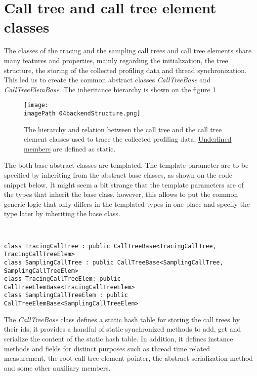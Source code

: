 \section{Call tree and call tree element classes}
The classes of the tracing and the sampling call trees and call tree elements share many features and properties, mainly regarding the initialization, the tree structure, the storing of the collected profiling data and thread synchronization. This led us to create the common abstract classes \textit{CallTreeBase} and \textit{CallTreeElemBase}. The inheritance hierarchy is shown on the figure \ref{fig:04backendStructure}


\begin{figure}
	\centering
		\texttt{[image: \\imagePath 04backendStructure.png]}
		\caption{The hierarchy and relation between the call tree and the call tree element classes used to trace the collected profiling data. \underline{Underlined members} are defined as static.}
	\label{fig:04backendStructure}
\end{figure}

The both base abstract classes are templated. The template parameter are to be specified by inheriting from the abstract base classes, as shown on the code snippet below. It might seem a bit strange that the template parameters are of the types that inherit the base class, however, this allows to put the common generic logic that only differs in the templated types in one place and specify the type later by inheriting the base class.

\ 

\begin{lstlisting} 
class TracingCallTree : public CallTreeBase<TracingCallTree, TracingCallTreeElem>
class SamplingCallTree : public CallTreeBase<SamplingCallTree, SamplingCallTreeElem>
class TracingCallTreeElem: public CallTreeElemBase<TracingCallTreeElem>
class SamplingCallTreeElem : public CallTreeElemBase<SamplingCallTreeElem>
\end{lstlisting}

The \textit{CallTreeBase} class defines a static hash table for storing the call trees by their ids, it provides a handful of static synchronized methods to add, get and serialize the content of the static hash table. In addition, it defines instance methods and fields for distinct purposes such as thread time related measurement, the root call tree element pointer, the abstract serialization method and some other auxiliary members.


